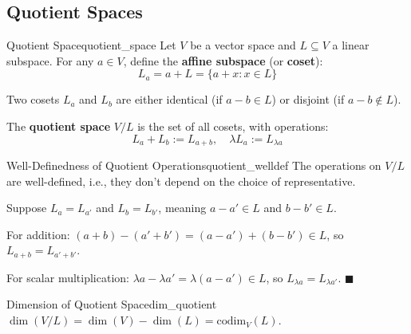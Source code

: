 \documentclass[11pt, letterpaper, openany]{book}
\renewenvironment{proof}[1][\proofname]{%
  \tcolorbox[blanker, breakable, left=1em,
    before skip=1em, after skip=1em,
    borderline west={2pt}{0pt}{MagicTeal!50},
    colback=MagicCream,
    before upper={\textcolor{MagicTeal}{\sffamily\bfseries #1.}\space}
  ]%
}{%
  \hfill\textcolor{MagicTeal}{\ensuremath{\blacksquare}}\endtcolorbox%
}
\begin{document}
\subsection{Quotient Spaces}

\begin{defn}{Quotient Space}{quotient_space}
Let $V$ be a vector space and $L \subseteq V$ a linear subspace. For any $a \in V$, define the \textbf{affine subspace} (or \textbf{coset}):
\[L_a = a + L = \{a + x : x \in L\}\]

Two cosets $L_a$ and $L_b$ are either identical (if $a - b \in L$) or disjoint (if $a - b \notin L$).

The \textbf{quotient space} $V/L$ is the set of all cosets, with operations:
\[L_a + L_b := L_{a+b}, \quad \lambda L_a := L_{\lambda a}\]
\end{defn}

\begin{center}
\end{center}

\begin{thm}{Well-Definedness of Quotient Operations}{quotient_welldef}
The operations on $V/L$ are well-defined, i.e., they don't depend on the choice of representative.
\end{thm}

\begin{proof}
Suppose $L_a = L_{a'}$ and $L_b = L_{b'}$, meaning $a - a' \in L$ and $b - b' \in L$.

For addition: $(a + b) - (a' + b') = (a - a') + (b - b') \in L$, so $L_{a+b} = L_{a'+b'}$.

For scalar multiplication: $\lambda a - \lambda a' = \lambda(a - a') \in L$, so $L_{\lambda a} = L_{\lambda a'}$.
\end{proof}

\begin{thm}{Dimension of Quotient Space}{dim_quotient}
$\dim(V/L) = \dim(V) - \dim(L) = \text{codim}_V(L)$.
\end{thm}
\end{document}
